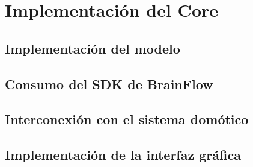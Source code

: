 \chapter{Implementación del Core}\label{ch:core_implementing}

\section{Implementación del modelo}

\section{Consumo del SDK de BrainFlow}

\section{Interconexión con el sistema domótico}

\section{Implementación de la interfaz gráfica}